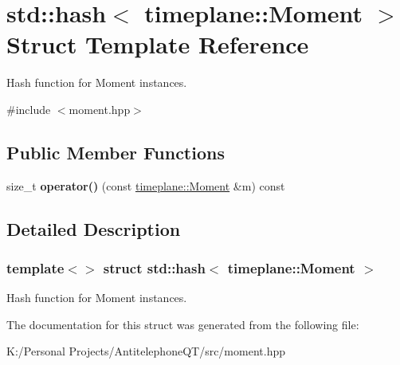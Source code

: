 \hypertarget{structstd_1_1hash_3_01timeplane_1_1_moment_01_4}{}\section{std\+:\+:hash$<$ timeplane\+:\+:Moment $>$ Struct Template Reference}
\label{structstd_1_1hash_3_01timeplane_1_1_moment_01_4}


Hash function for {\ttfamily Moment} instances.  




{\ttfamily \#include $<$moment.\+hpp$>$}

\subsection*{Public Member Functions}
\begin{DoxyCompactItemize}
\item 
\mbox{\label{structstd_1_1hash_3_01timeplane_1_1_moment_01_4_ad80181ebc12d459ea83dd1f62ddb6713}} 
size\+\_\+t {\bfseries operator()} (const \hyperlink{classtimeplane_1_1_moment}{timeplane\+::\+Moment} \&m) const
\end{DoxyCompactItemize}


\subsection{Detailed Description}
\subsubsection*{template$<$$>$\newline
struct std\+::hash$<$ timeplane\+::\+Moment $>$}

Hash function for {\ttfamily Moment} instances. 

The documentation for this struct was generated from the following file\+:\begin{DoxyCompactItemize}
\item 
K\+:/\+Personal Projects/\+Antitelephone\+Q\+T/src/moment.\+hpp\end{DoxyCompactItemize}
